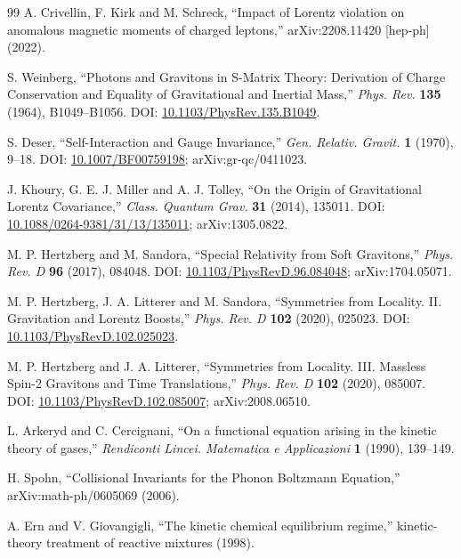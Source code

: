 \documentclass[11pt,a4paper]{article}
\begin{document}
\begin{thebibliography}{99}
A. Crivellin, F. Kirk and M. Schreck, ``Impact of Lorentz violation on anomalous magnetic moments of charged leptons,'' arXiv:2208.11420 [hep-ph] (2022).

S. Weinberg, ``Photons and Gravitons in S-Matrix Theory: Derivation of Charge Conservation and Equality of Gravitational and Inertial Mass,'' \emph{Phys. Rev.} \textbf{135} (1964), B1049--B1056. DOI: \href{https://doi.org/10.1103/PhysRev.135.B1049}{10.1103/PhysRev.135.B1049}.

S. Deser, ``Self-Interaction and Gauge Invariance,'' \emph{Gen. Relativ. Gravit.} \textbf{1} (1970), 9--18. DOI: \href{https://doi.org/10.1007/BF00759198}{10.1007/BF00759198}; arXiv:gr-qc/0411023.

J. Khoury, G. E. J. Miller and A. J. Tolley, ``On the Origin of Gravitational Lorentz Covariance,'' \emph{Class. Quantum Grav.} \textbf{31} (2014), 135011. DOI: \href{https://doi.org/10.1088/0264-9381/31/13/135011}{10.1088/0264-9381/31/13/135011}; arXiv:1305.0822.

M. P. Hertzberg and M. Sandora, ``Special Relativity from Soft Gravitons,'' \emph{Phys. Rev. D} \textbf{96} (2017), 084048. DOI: \href{https://doi.org/10.1103/PhysRevD.96.084048}{10.1103/PhysRevD.96.084048}; arXiv:1704.05071.

M. P. Hertzberg, J. A. Litterer and M. Sandora, ``Symmetries from Locality. II. Gravitation and Lorentz Boosts,'' \emph{Phys. Rev. D} \textbf{102} (2020), 025023. DOI: \href{https://doi.org/10.1103/PhysRevD.102.025023}{10.1103/PhysRevD.102.025023}.

M. P. Hertzberg and J. A. Litterer, ``Symmetries from Locality. III. Massless Spin-2 Gravitons and Time Translations,'' \emph{Phys. Rev. D} \textbf{102} (2020), 085007. DOI: \href{https://doi.org/10.1103/PhysRevD.102.085007}{10.1103/PhysRevD.102.085007}; arXiv:2008.06510.


L. Arkeryd and C. Cercignani, ``On a functional equation arising in the kinetic theory of gases,'' \emph{Rendiconti Lincei. Matematica e Applicazioni} \textbf{1} (1990), 139--149.

H. Spohn, ``Collisional Invariants for the Phonon Boltzmann Equation,'' arXiv:math-ph/0605069 (2006).

A. Ern and V. Giovangigli, ``The kinetic chemical equilibrium regime,'' kinetic-theory treatment of reactive mixtures (1998).


\end{thebibliography}
\end{document}
